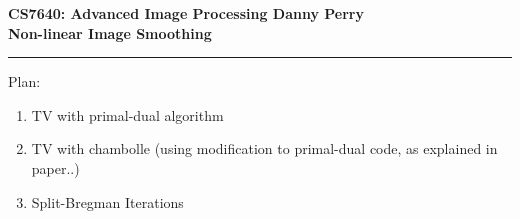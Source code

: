 \documentclass[11pt]{article}
\begin{document}
\thispagestyle{empty}
{\large{\bf CS7640: Advanced Image Processing \hfill Danny Perry}}\\

{\LARGE{\bf Non-linear Image Smoothing}}
\vspace{0.2\baselineskip}
\hrule

Plan:
\begin{enumerate}
\item TV with primal-dual algorithm
\item TV with chambolle (using modification to primal-dual code, as explained in paper..)
\item Split-Bregman Iterations
\end{enumerate}
\end{document}
